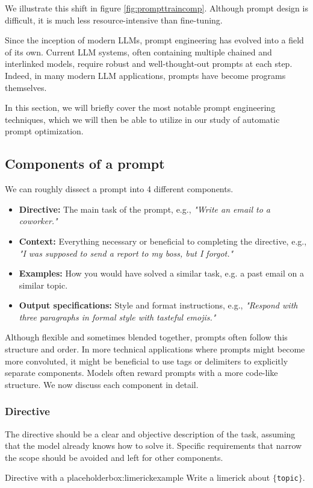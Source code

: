 We illustrate this shift in figure \ref{fig:prompttraincomp}. Although prompt design is difficult, it is much less resource-intensive than fine-tuning.

Since the inception of modern LLMs, prompt engineering has evolved into a field of its own. Current LLM systems, often containing
multiple chained and interlinked models, require robust and well-thought-out prompts at each step. 
Indeed, in many modern LLM applications, prompts have become programs themselves\cite{schnabel2024symbolicpromptprogramsearch}.

In this section, we will briefly cover the most notable prompt engineering techniques, which we will then
be able to utilize in our study of automatic prompt optimization.
\subsection{Components of a prompt}
We can roughly dissect a prompt into 4 different components\cite{schulhoff2024promptreportsystematicsurvey}. 
\begin{itemize}
    \item \textbf{Directive:} The main task of the prompt, e.g., \textit{"Write an email to a coworker."}
    \item \textbf{Context:} Everything necessary or beneficial to completing the directive, e.g., \textit{"I was supposed to send a report to my boss, but I forgot."}
    \item \textbf{Examples:} How you would have solved a similar task, e.g. a past email on a similar topic.
    \item \textbf{Output specifications:} Style and format instructions, e.g., \textit{"Respond with three paragraphs in formal style with tasteful emojis."}
\end{itemize}

Although flexible and sometimes blended together, prompts often follow this structure and order. 
In more technical applications where prompts might become more convoluted, it might be beneficial to use tags or delimiters to explicitly separate components.
Models often reward prompts with a more code-like structure\cite{10.1145/3544548.3581388}. We now discuss each component in detail.

\subsubsection{Directive}
The directive should be a clear and objective description of the task, assuming that the model
already knows how to solve it\cite{reynolds2021promptprogramminglargelanguage}. 
Specific requirements that narrow the scope should be avoided and left for other components.
\begin{figurebox}{Directive with a placeholder}{box:limerickexample}
    Write a limerick about \texttt{$\{$topic$\}$}.
\end{figurebox}

